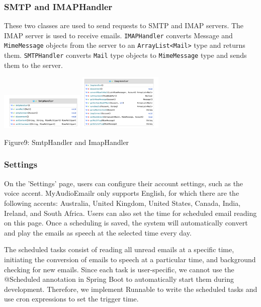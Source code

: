 \documentclass{article}
\begin{document}
\subsubsection{SMTP and IMAPHandler}
These two classes are used to send requests to SMTP and IMAP servers. 
The IMAP server is used to receive emails. \texttt{IMAPHandler} converts Message and \texttt{MimeMessage} objects from the server to an \texttt{ArrayList<Mail>} type and returns them. 
\texttt{SMTPHandler} converts \texttt{Mail} type objects to \texttt{MimeMessage} type and sends them to the server.
\begin{center}
\includegraphics[width=0.3\textwidth]{smtpHandler.png} 
\includegraphics[width=0.3\textwidth]{imapHandler.png}
\end{center}
\begin{center}
Figure9: SmtpHandler and ImapHandler
\end{center}
\subsubsection{Settings}
 On the 'Settings' page, users can configure their account settings, such as the voice accent. MyAudioEmailr only supports English, for which there are the following accents: Australia, United Kingdom, United States, Canada, India, Ireland, and South Africa. Users can also set the time for scheduled email reading on this page. Once a scheduling is saved, the system will automatically convert and play the emails as speech at the selected time every day.

The scheduled tasks consist of reading all unread emails at a specific time, initiating the conversion of emails to speech at a particular time, and background checking for new emails. Since each task is user-specific, we cannot use the @Scheduled annotation in Spring Boot to automatically start them during development. Therefore, we implement Runnable to write the scheduled tasks and use cron expressions to set the trigger time.
\end{document}
